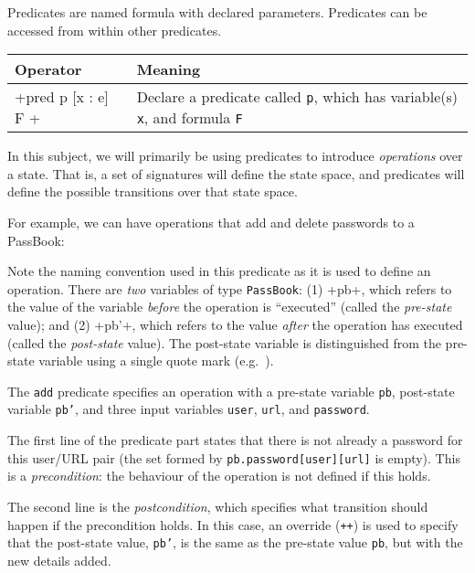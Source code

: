 Predicates are named formula with declared parameters. Predicates can be accessed from within other predicates.

\begin{center}
\begin{tabular}{ll}
\toprule
 Operator & Meaning\\
\midrule
 \A+pred p [x : e] { F }+ & Declare a predicate called \texttt{p}, which has variable(s) \texttt{x}, and formula \texttt{F}\\
\bottomrule
\end{tabular}
\end{center}

In this subject, we will primarily be using predicates to introduce \emph{operations} over a state. That is, a set of signatures will define the state space, and predicates will define the possible transitions over that state space.

For example, we can have operations that add and delete passwords to a PassBook:


Note the naming convention used in this predicate as it is used to define an operation. There are \emph{two} variables of type \texttt{PassBook}:
(1) \A+pb+, which refers to the value of the variable \emph{before} the operation is ``executed'' (called the \emph{pre-state} value); and (2) \A+pb'+, which refers to the value \emph{after} the operation has executed (called the \emph{post-state} value). The post-state variable is distinguished from the pre-state variable using a single quote mark (e.g.\ ).

The \texttt{add} predicate specifies an operation with a pre-state variable \texttt{pb}, post-state variable \texttt{pb'}, and three input variables \texttt{user}, \texttt{url}, and \texttt{password}. 

The first line of the predicate part states that there is not already a password for this user/URL pair (the set formed by \texttt{pb.password[user][url]} is empty). This is a \emph{precondition}: the behaviour of the operation is not defined if this holds.

The second line is the \emph{postcondition}, which specifies what transition should happen if the precondition holds. In this case, an override (\texttt{++}) is used to specify that the post-state value, \texttt{pb'}, is the same as the pre-state value \texttt{pb}, but with the new details added.

